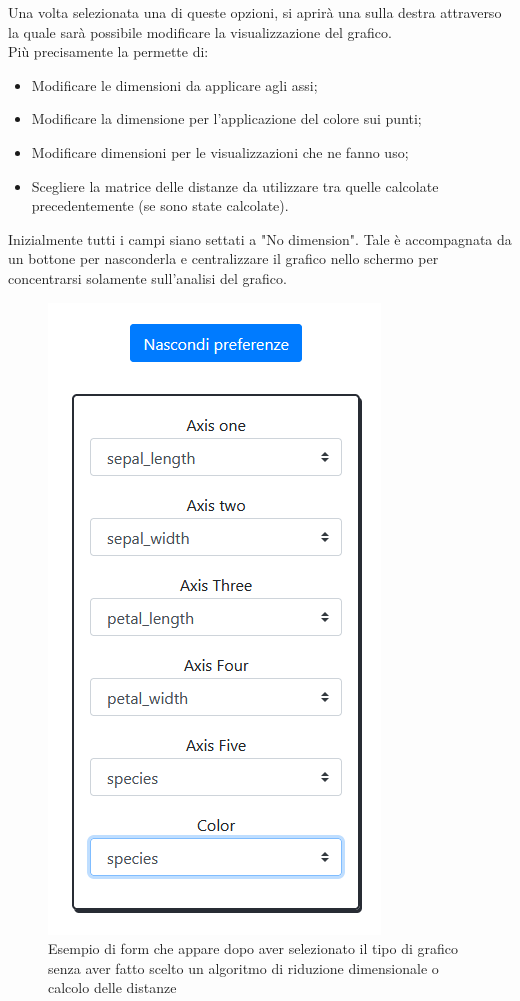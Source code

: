 Una volta selezionata una di queste opzioni, si aprirà una  sulla destra attraverso la quale sarà possibile modificare la visualizzazione del grafico.\\
Più precisamente la  permette di:
\begin{itemize}
	\item Modificare le dimensioni da applicare agli assi;
	\item Modificare la dimensione per l'applicazione del colore sui punti;
	\item Modificare dimensioni per le visualizzazioni che ne fanno uso;
	\item Scegliere la matrice delle distanze da utilizzare tra quelle calcolate precedentemente (se sono state calcolate).
\end{itemize} 
Inizialmente tutti i campi siano settati a "No dimension". Tale  è accompagnata da un bottone per nasconderla e centralizzare il grafico nello schermo per concentrarsi solamente sull'analisi del grafico.
\begin{figure}[H]
		\includegraphics[scale=0.45]{Images/Form.png}
		\centering
		\caption{Esempio di form che appare dopo aver selezionato il tipo di grafico senza aver fatto scelto un algoritmo di riduzione dimensionale o calcolo delle distanze}
\end{figure}

